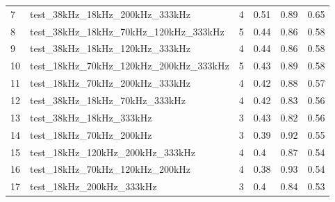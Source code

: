\begin{longtable}{llllll}
7                      & test\_38kHz\_18kHz\_200kHz\_333kHz                & 4                        & 0.51                           & 0.89                        & 0.65                           \\
8                      & test\_38kHz\_18kHz\_70kHz\_120kHz\_333kHz         & 5                        & 0.44                           & 0.86                        & 0.58                           \\
9                      & test\_38kHz\_18kHz\_120kHz\_333kHz                & 4                        & 0.44                           & 0.86                        & 0.58                           \\
10                     & test\_18kHz\_70kHz\_120kHz\_200kHz\_333kHz        & 5                        & 0.43                           & 0.89                        & 0.58                           \\
11                     & test\_18kHz\_70kHz\_200kHz\_333kHz                & 4                        & 0.42                           & 0.88                        & 0.57                           \\
12                     & test\_38kHz\_18kHz\_70kHz\_333kHz                 & 4                        & 0.42                           & 0.83                        & 0.56                           \\
13                     & test\_38kHz\_18kHz\_333kHz                        & 3                        & 0.43                           & 0.82                        & 0.56                           \\
14                     & test\_18kHz\_70kHz\_200kHz                        & 3                        & 0.39                           & 0.92                        & 0.55                           \\
15                     & test\_18kHz\_120kHz\_200kHz\_333kHz               & 4                        & 0.4                            & 0.87                        & 0.54                           \\
16                     & test\_18kHz\_70kHz\_120kHz\_200kHz                & 4                        & 0.38                           & 0.93                        & 0.54                           \\
17                     & test\_18kHz\_200kHz\_333kHz                       & 3                        & 0.4                            & 0.84                        & 0.53                           \\

\end{longtable}

